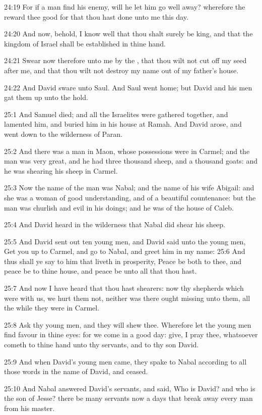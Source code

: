 24:19 For if a man find his enemy, will he let him go well away?
wherefore the \LORD reward thee good for that thou hast done unto me
this day.

24:20 And now, behold, I know well that thou shalt surely be king, and
that the kingdom of Israel shall be established in thine hand.

24:21 Swear now therefore unto me by the \LORD, that thou wilt not cut
off my seed after me, and that thou wilt not destroy my name out of my
father's house.

24:22 And David sware unto Saul. And Saul went home; but David and his
men gat them up unto the hold.

25:1 And Samuel died; and all the Israelites were gathered together,
and lamented him, and buried him in his house at Ramah. And David
arose, and went down to the wilderness of Paran.

25:2 And there was a man in Maon, whose possessions were in Carmel;
and the man was very great, and he had three thousand sheep, and a
thousand goats: and he was shearing his sheep in Carmel.

25:3 Now the name of the man was Nabal; and the name of his wife
Abigail: and she was a woman of good understanding, and of a beautiful
countenance: but the man was churlish and evil in his doings; and he
was of the house of Caleb.

25:4 And David heard in the wilderness that Nabal did shear his sheep.

25:5 And David sent out ten young men, and David said unto the young
men, Get you up to Carmel, and go to Nabal, and greet him in my name:
25:6 And thus shall ye say to him that liveth in prosperity, Peace be
both to thee, and peace be to thine house, and peace be unto all that
thou hast.

25:7 And now I have heard that thou hast shearers: now thy shepherds
which were with us, we hurt them not, neither was there ought missing
unto them, all the while they were in Carmel.

25:8 Ask thy young men, and they will shew thee. Wherefore let the
young men find favour in thine eyes: for we come in a good day: give,
I pray thee, whatsoever cometh to thine hand unto thy servants, and to
thy son David.

25:9 And when David's young men came, they spake to Nabal according to
all those words in the name of David, and ceased.

25:10 And Nabal answered David's servants, and said, Who is David? and
who is the son of Jesse? there be many servants now a days that break
away every man from his master.


